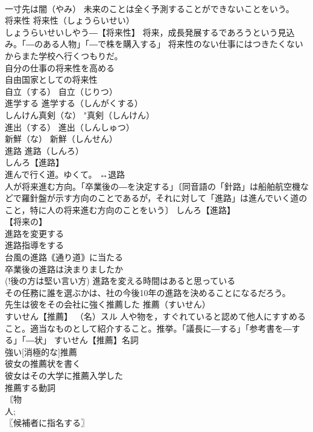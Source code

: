 \documentclass[8pt]{extreport}
\begin{document}
\begin{CJK}{UTF8}{min}
\\	一寸先は闇（やみ） 未来のことは全く予測することができないことをいう。
\\	将来性		将来性（しょうらいせい） 
\\	しょうらいせいしやう―【将来性】 将来，成長発展するであろうという見込み。「―のある人物」「―で株を購入する」 将来性のない仕事にはつきたくないからまた学校へ行くつもりだ。 
\\	自分の仕事の将来性を高める 
\\	自由国家としての将来性 
\\	自立（する）		自立（じりつ） 
\\	進学する		進学する（しんがくする） 
\\	しんけん真剣（な）		"真剣（しんけん） 
\\	進出（する）		進出（しんしゅつ） 
\\	新鮮（な）		新鮮（しんせん） 
\\	進路		進路（しんろ） 
\\	しんろ【進路】 
\\	進んで行く道。ゆくて。 ↔退路 
\\	人が将来進む方向。「卒業後の―を決定する」〔同音語の「針路」は船舶航空機などで羅針盤が示す方向のことであるが，それに対して「進路」は進んでいく道のこと，特に人の将来進む方向のことをいう〕 しんろ【進路】 
\\	【将来の】
\\	進路を変更する 
\\	進路指導をする 
\\	台風の進路｟通り道｠に当たる 
\\	卒業後の進路は決まりましたか 
\\	(!後の方は堅い言い方) 進路を変える時間はあると思っている 
\\	その任務に誰を選ぶかは、社の今後10年の進路を決めることになるだろう。 
\\	先生は彼をその会社に強く推薦した		推薦（すいせん） 
\\	すいせん【推薦】 （名）スル 人や物を，すぐれていると認めて他人にすすめること。適当なものとして紹介すること。推挙。「議長に―する」「参考書を―する」「―状」 すいせん【推薦】名詞 
\\	強い[消極的な]推薦 
\\	彼女の推薦状を書く 
\\	彼女はその大学に推薦入学した 
\\	推薦する動詞 
\\	〘物
\\	人; 
\\	〖候補者に指名する〗

\end{CJK}
\end{document}
